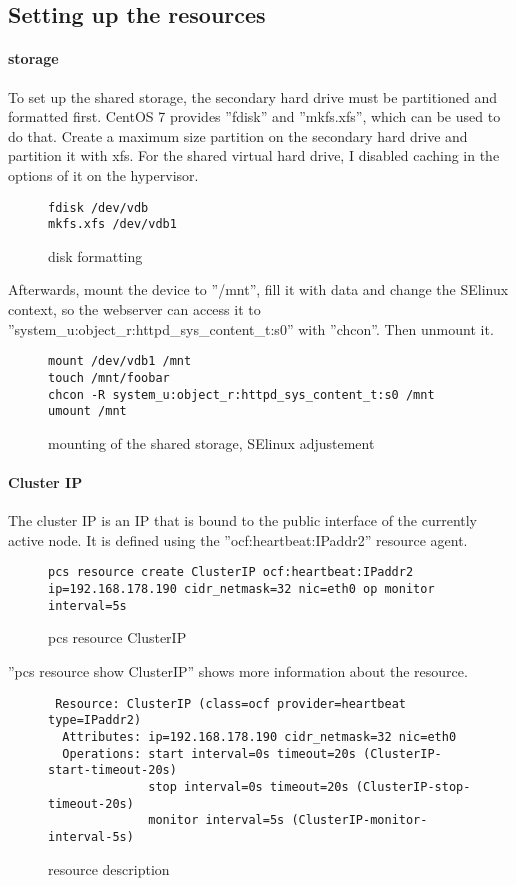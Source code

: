 \subsection{Setting up the resources}
\paragraph{storage}
To set up the shared storage, the secondary hard drive must be partitioned
and formatted first. CentOS 7 provides ''fdisk'' and ''mkfs.xfs'', which
can be used to do that. Create a maximum size partition on the secondary hard drive
and partition it with xfs. For the shared virtual hard drive, I disabled caching in
the options of it on the hypervisor.
\begin{figure}
\begin{lstlisting}
fdisk /dev/vdb
mkfs.xfs /dev/vdb1
\end{lstlisting}
\caption{disk formatting}
\end{figure}
Afterwards, mount the device to ''/mnt'', fill it with data and change the SElinux context, so the 
webserver can access it to ''system\_u:object\_r:httpd\_sys\_content\_t:s0'' with ''chcon''.
Then unmount it.
\begin{figure}
\begin{lstlisting}
mount /dev/vdb1 /mnt
touch /mnt/foobar
chcon -R system_u:object_r:httpd_sys_content_t:s0 /mnt
umount /mnt
\end{lstlisting}
\caption{mounting of the shared storage, SElinux adjustement}
\end{figure}
\paragraph{Cluster IP}
The cluster IP is an IP that is bound to the public interface of the currently
active node.
It is defined using the ''ocf:heartbeat:IPaddr2'' resource agent.
\begin{figure}
\begin{lstlisting}
pcs resource create ClusterIP ocf:heartbeat:IPaddr2 ip=192.168.178.190 cidr_netmask=32 nic=eth0 op monitor interval=5s
\end{lstlisting}
\caption{pcs resource ClusterIP}
\end{figure}
''pcs resource show ClusterIP'' shows more information about the resource.
\begin{figure}
\begin{lstlisting}
 Resource: ClusterIP (class=ocf provider=heartbeat type=IPaddr2)
  Attributes: ip=192.168.178.190 cidr_netmask=32 nic=eth0 
  Operations: start interval=0s timeout=20s (ClusterIP-start-timeout-20s)
              stop interval=0s timeout=20s (ClusterIP-stop-timeout-20s)
              monitor interval=5s (ClusterIP-monitor-interval-5s)
\end{lstlisting}
\caption{resource description}
\end{figure}
